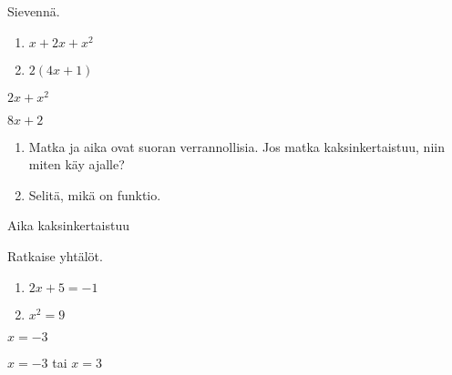 \begin{tehtava}
Sievennä.
\begin{enumerate}
\item $x + 2x+x^2$
\item $2(4x+1)$
\end{enumerate}
\begin{vastaus}
\item $2x +x^2$
\item $8x+2$
\end{vastaus}
\end{tehtava}

\begin{tehtava}
\begin{enumerate}
\item Matka ja aika ovat suoran verrannollisia. Jos matka kaksinkertaistuu, niin miten käy ajalle?
\item Selitä, mikä on funktio.
\end{enumerate}
\begin{vastaus}
\item Aika kaksinkertaistuu
\item %
\end{vastaus}
\end{tehtava}

\begin{tehtava}
Ratkaise yhtälöt.
\begin{enumerate}
\item $2x+5 = -1$
\item $x^2 = 9$
\end{enumerate}
\begin{vastaus}
\item $x=-3$
\item $x=-3$ tai $x=3$
\end{vastaus}
\end{tehtava}
